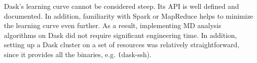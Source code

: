 Dask's learning curve cannot be considered steep.
Its API is well defined and documented.
In addition, familiarity with Spark or MapReduce helps to minimize the learning curve even further.
As a result, implementing MD analysis algorithms on Dask did not require significant engineering time.
In addition, setting up a Dask cluster on a set of resources was relatively straightforward, since it provides all the binaries, e.g. \texttt(dask-ssh).




